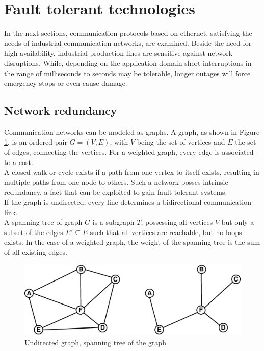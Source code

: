 \section{Fault tolerant technologies}
In the next sections, communication protocols based on ethernet, satisfying the needs of industrial communication networks, are examined. Beside the need for high availability,
industrial production lines
are sensitive against network disruptions. While, depending on the application domain short interruptions in the range of milliseconds to seconds may be
tolerable, longer outages will force emergency stops or even cause damage.

\subsection{Network redundancy}

Communication networks can be modeled as graphs. A graph, as shown in Figure \ref{fig:graph}, is an ordered pair $G=(V,E)$, with $V$ being the set of vertices and $E$
the set of edges, connecting the vertices. For a weighted graph, every edge is associated to a cost. 
\\
A closed walk or cycle exists if a path from one vertex to itself exists, resulting in multiple paths from one node to others.
Such a network posses intrinsic redundancy, a fact that can be exploited to gain fault tolerant systems.
\\
If the graph is undirected, every line determines a bidirectional communication link. 
\\
A spanning tree of graph $G$ is a subgraph $T$, possessing all vertices $V$ but only a subset of the edges $E' \subseteq E$ such that all vertices are reachable,
but no loops exists. In the case of a weighted graph, the weight of the spanning tree is the sum of all existing edges.
\begin{figure}[H]
\centering
 \includegraphics[width=0.8\linewidth]{figures/graph.eps}
 \caption{Undirected graph, spanning tree of the graph}
\label{fig:graph}
\end{figure}

